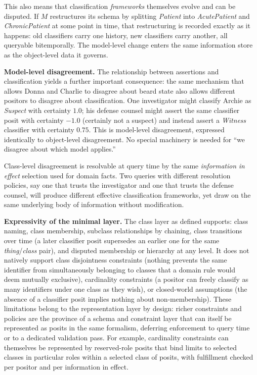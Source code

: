 \documentclass[a4paper,fleqn]{cas-sc}
\begin{document}
This also means that classification \emph{frameworks} themselves evolve and can be disputed. If $M$ restructures its schema by splitting \textit{Patient} into \textit{AcutePatient} and \textit{ChronicPatient} at some point in time, that restructuring is recorded exactly as it happens: old classifiers carry one history, new classifiers carry another, all queryable bitemporally. The model-level change enters the same information store as the object-level data it governs.

\textbf{Model-level disagreement.}
The relationship between assertions and classification yields a further important consequence: the same mechanism that allows Donna and Charlie to disagree about beard state also allows different positors to disagree about classification. One investigator might classify Archie as \textit{Suspect} with certainty $1.0$; his defense counsel might assert the same classifier posit with certainty $-1.0$ (certainly not a suspect) and instead assert a \textit{Witness} classifier with certainty $0.75$. This is model-level disagreement, expressed identically to object-level disagreement. No special machinery is needed for ``we disagree about which model applies.''

Class-level disagreement is resolvable at query time by the same \emph{information in effect} selection used for domain facts. Two queries with different resolution policies, say one that trusts the investigator and one that trusts the defense counsel, will produce different effective classification frameworks, yet draw on the same underlying body of information without modification.

\textbf{Expressivity of the minimal layer.}
The class layer as defined supports: class naming, class membership, subclass relationships by chaining, class transitions over time (a later classifier posit supersedes an earlier one for the same \textit{thing}/\textit{class} pair), and disputed membership or hierarchy at any level. It does not natively support class disjointness constraints (nothing prevents the same identifier from simultaneously belonging to classes that a domain rule would deem mutually exclusive), cardinality constraints (a positor can freely classify as many identifiers under one class as they wish), or closed-world assumptions (the absence of a classifier posit implies nothing about non-membership). These limitations belong to the representation layer by design: richer constraints and policies are the province of a schema and constraint layer that can itself be represented as posits in the same formalism, deferring enforcement to query time or to a dedicated validation pass. For example, cardinality constraints can themselves be represented by reserved-role posits that bind limits to selected classes in particular roles within a selected class of posits, with fulfillment checked per positor and per information in effect.
\end{document}
